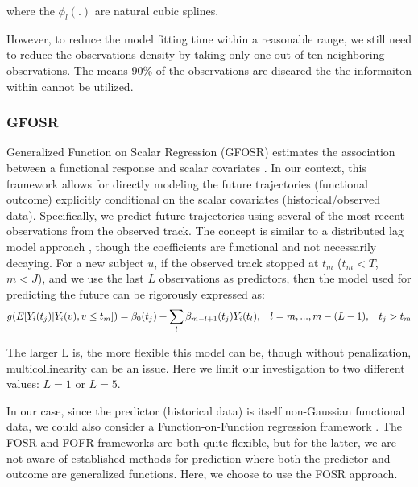 \documentclass[12pt]{article}
\begin{document}
where the $\phi_l(.)$ are natural cubic splines.

However, to reduce the model fitting time within a reasonable range, we still need to reduce the observations density by taking only one out of ten neighboring observations. The means 90\% of the observations are discared the the informaiton within cannot be utilized. 

\subsubsection{GFOSR}
\label{subsubsec:gfosr}

Generalized Function on Scalar Regression (GFOSR) estimates the association between a functional response and scalar covariates {\color{purple}\citep{Reiss2010, fda2005, Bauer2018}}. In our context, this framework allows for directly modeling the future trajectories (functional outcome) explicitly conditional on the scalar covariates (historical/observed data). Specifically, we predict future trajectories using several of the most recent observations from the observed track. The concept is similar to a distributed lag model approach \citep{Baek2022}, though the coefficients are functional and not necessarily decaying. For a new subject $u$, if the observed track stopped at $t_m$ ($t_m < T$, $m < J$), and we use the last $L$ observations as predictors, then the model used for predicting the future can be rigorously expressed as: 
\begin{equation}
g(E[Y_i(t_j)|Y_i(v), v\leq t_m]) = \beta_0(t_j) +\sum_{l} \beta_{m-l+1} (t_j)Y_i(t_l), \hspace{0.3cm}
l  = m,...,m-(L-1),  \hspace{0.3cm}
t_j > t_m 
\label{eq:gfosr}  
\end{equation}

The larger L is, the more flexible this model can be, though without penalization, multicollinearity can be an issue. Here we limit our investigation to two different values: $L = 1$ or $L = 5$.

In our case, since the predictor (historical data) is itself non-Gaussian functional data, we could also consider a Function-on-Function regression framework \citep{Morris2015, fdaR2024,Goldsmith2011}. The FOSR and FOFR frameworks are both quite flexible, but for the latter, we are not aware of established methods for prediction where both the predictor and outcome are generalized functions. Here, we choose to use the FOSR approach. 
\end{document}
